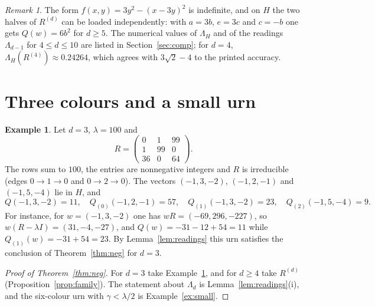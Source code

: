 \documentclass[11pt]{amsart}
\theoremstyle{definition}
\newtheorem{example}[theorem]{Example}
\theoremstyle{remark}
\newtheorem{remark}[theorem]{Remark}
\begin{document}
\begin{remark}
The form $f(x,y)=3y^2-(x-3y)^2$ is indefinite, and on $H$ the two halves of $R^{(d)}$ can be loaded independently: with $a=3b$, $e=3c$ and $c=-b$ one gets $Q(w)=6b^2$ for $d\ge5$. The numerical values of $\Lambda_H$ and of the readings $\Lambda_{d-1}$ for $4\le d\le 10$ are listed in Section~\ref{sec:comp}; for $d=4$, $\Lambda_H(R^{(4)})\approx 0.24264$, which agrees with $3\sqrt2-4$ to the printed accuracy.
\end{remark}

\section{Three colours and a small urn}\label{sec:examples}

\begin{example}\label{ex:three}
Let $d=3$, $\lambda=100$ and
\[
R=\begin{pmatrix}0&1&99\\1&99&0\\36&0&64\end{pmatrix}.
\]
The rows sum to $100$, the entries are nonnegative integers and $R$ is irreducible (edges $0\to1\to0$ and $0\to2\to0$). The vectors $(-1,3,-2)$, $(-1,2,-1)$ and $(-1,5,-4)$ lie in $H$, and
\[
Q(-1,3,-2)=11,\quad Q_{(0)}(-1,2,-1)=57,\quad Q_{(1)}(-1,3,-2)=23,\quad Q_{(2)}(-1,5,-4)=9.
\]
For instance, for $w=(-1,3,-2)$ one has $wR=(-69,296,-227)$, so $w(R-\lambda I)=(31,-4,-27)$, and $Q(w)=-31-12+54=11$ while $Q_{(1)}(w)=-31+54=23$. By Lemma~\ref{lem:readings} this urn satisfies the conclusion of Theorem~\ref{thm:neg} for $d=3$.
\end{example}

\begin{proof}[Proof of Theorem~\ref{thm:neg}]
For $d=3$ take Example~\ref{ex:three}, and for $d\ge 4$ take $R^{(d)}$ (Proposition~\ref{prop:family}). The statement about $\Lambda_d$ is Lemma~\ref{lem:readings}(i), and the six-colour urn with $\gamma<\lambda/2$ is Example~\ref{ex:small}.
\end{proof}
\end{document}
